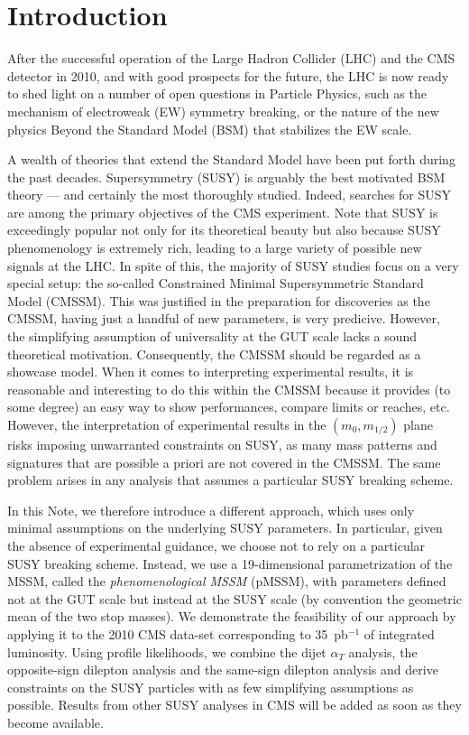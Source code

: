 \section{Introduction}
\label{sec:intro}

After the successful operation of the Large Hadron Collider (LHC) and the CMS detector
in 2010, and with good prospects for the future, the LHC is now ready to shed light on a number 
of open questions in Particle Physics, 
such as the mechanism of electroweak (EW) symmetry breaking, or the nature 
of the new physics Beyond the Standard Model (BSM) that stabilizes the EW scale. 

A wealth of theories that extend the Standard Model have been put forth during the past decades. Supersymmetry (SUSY) is
arguably the best motivated BSM theory --- and certainly the most 
thoroughly studied. 
Indeed, searches for SUSY are among the primary objectives of the 
CMS experiment. Note that SUSY is exceedingly popular not 
only for its theoretical beauty but also because SUSY phenomenology 
is extremely rich, 
leading to a large variety of possible new signals at the LHC. 
In spite of this, the majority of SUSY studies focus on a very special 
setup: the so-called Constrained Minimal Supersymmetric Standard Model (CMSSM). 
This was justified in the preparation for discoveries as the CMSSM, 
having just a handful of new parameters, is very predicive. However, 
the simplifying assumption of universality at the GUT scale lacks a sound 
theoretical motivation. Consequently, the CMSSM should be regarded as a showcase 
model. When it comes to interpreting experimental results, it is reasonable and interesting to do this within the CMSSM because it 
provides (to some degree) an easy way to show performances, 
compare limits or reaches, etc. However, the interpretation of experimental results in the 
$(m_0,m_{1/2})$ plane risks imposing unwarranted constraints on SUSY, as many 
mass patterns and signatures that are possible a priori are not covered in the CMSSM. 
The same problem arises in any analysis that assumes a particular 
SUSY breaking scheme. 

In this Note, we therefore introduce a different approach, which uses only 
minimal assumptions on the underlying SUSY parameters. In particular, given the absence of experimental guidance, we choose
not to rely on a particular SUSY breaking scheme.
Instead, we use a 19-dimensional 
parametrization of the MSSM, called the \emph{phenomenological MSSM} (pMSSM),
with parameters defined not at the GUT scale but instead at the SUSY scale 
(by convention the geometric mean of the two stop masses).
We demonstrate the feasibility of our approach by applying it to 
the 2010 CMS data-set corresponding to 35~pb$^{-1}$ of integrated luminosity.  
Using profile likelihoods, we combine 
the dijet $\alpha_T$ analysis, the opposite-sign dilepton 
analysis and the same-sign dilepton analysis and derive constraints 
on the SUSY particles with as few simplifying assumptions as possible.
Results from other SUSY analyses in CMS will be added as soon as they become available.

